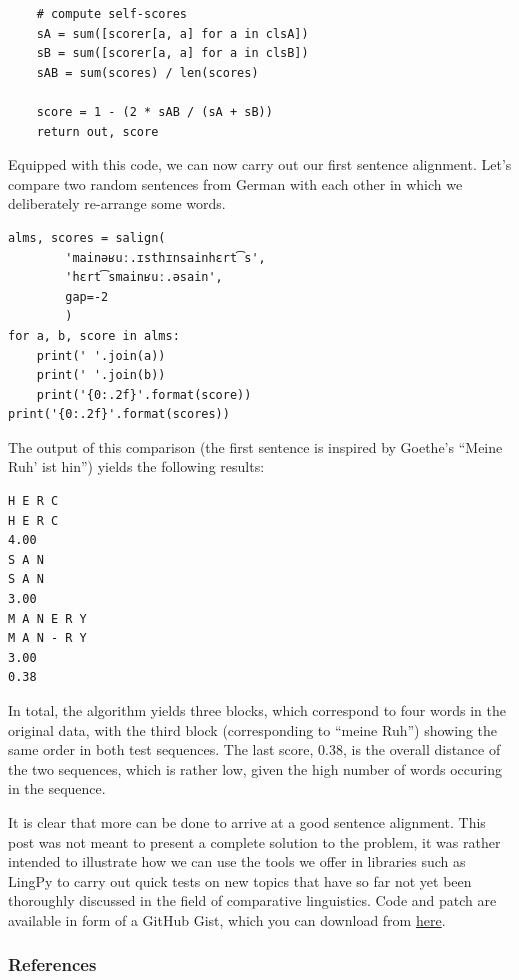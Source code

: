 \documentclass[
  a4paper,
  14pt,
  oneside,
  tablecaptionabove
]{scrbook}
\begin{document}
\begin{lstlisting}
    # compute self-scores
    sA = sum([scorer[a, a] for a in clsA])
    sB = sum([scorer[a, a] for a in clsB])
    sAB = sum(scores) / len(scores)

    score = 1 - (2 * sAB / (sA + sB))
    return out, score
\end{lstlisting}

Equipped with this code, we can now carry out our first sentence
alignment. Let's compare two random sentences from German with each
other in which we deliberately re-arrange some words.

\begin{lstlisting}
alms, scores = salign(
        'mainəʁuː.ɪsthɪnsainhɛrt͡s',
        'hɛrt͡smainʁuː.əsain',
        gap=-2
        )
for a, b, score in alms:
    print(' '.join(a))
    print(' '.join(b))
    print('{0:.2f}'.format(score))
print('{0:.2f}'.format(scores))
\end{lstlisting}

The output of this comparison (the first sentence is inspired by
Goethe's \enquote{Meine Ruh' ist hin}) yields the following results:

\begin{lstlisting}
H E R C
H E R C
4.00
S A N
S A N
3.00
M A N E R Y
M A N - R Y
3.00
0.38
\end{lstlisting}

In total, the algorithm yields three blocks, which correspond to four
words in the original data, with the third block (corresponding to
\enquote{meine Ruh}) showing the same order in both test sequences. The
last score, 0.38, is the overall distance of the two sequences, which is
rather low, given the high number of words occuring in the sequence.

It is clear that more can be done to arrive at a good sentence
alignment. This post was not meant to present a complete solution to the
problem, it was rather intended to illustrate how we can use the tools
we offer in libraries such as LingPy to carry out quick tests on new
topics that have so far not yet been thoroughly discussed in the field
of comparative linguistics. Code and patch are available in form of a
GitHub Gist, which you can download from
\href{https://gist.github.com/LinguList/8189f06f231909fbf1d1eed30998bd83}{here}.

\subsubsection*{References}
\end{document}
